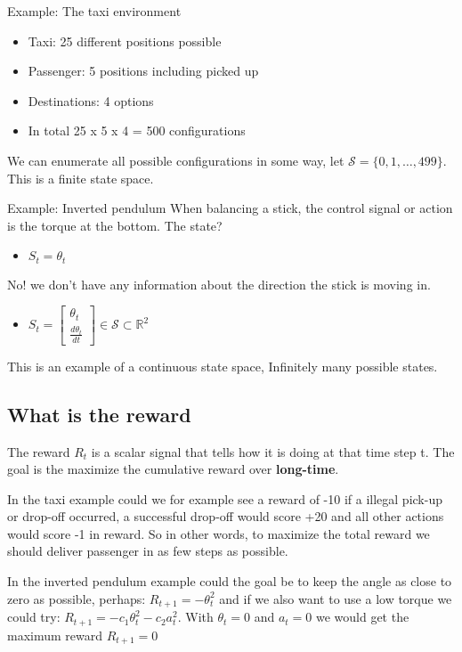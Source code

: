 \begin{example}{Example: The taxi environment}
\begin{itemize}
	\item Taxi: 25 different positions possible 
	\item Passenger: 5 positions including picked up
	\item Destinations: 4 options
	\item In total 25 x 5 x 4 = 500 configurations
\end{itemize}
We can enumerate all possible configurations in some way, let $\mathcal{S} = \{ 0,1, \ldots, 499\}$. This is a finite state space. 
\end{example}	

\begin{example}{Example: Inverted pendulum}
When balancing a stick, the control signal or action is the torque at the bottom. The state? 
\begin{itemize}
	\item $S_t = \theta_t$
\end{itemize}
No! we don't have any information about the direction the stick is moving in.

\begin{itemize}
 	\item $S_t = \begin{bmatrix} \theta_t \\ \frac{d \theta_t} {dt}  \end{bmatrix} \in \mathcal{S} \subset \mathbb{R}^{2} $
 \end{itemize} 
 This is an example of a continuous state space, Infinitely many possible states.

\end{example}	


\subsection*{What is the reward}
The reward $R_t$ is a scalar signal that tells how it is doing at that time step t. The goal is the maximize the cumulative reward over \textbf{long-time}. 

In the taxi example could we for example see a reward of -10 if a illegal pick-up or drop-off occurred, a successful drop-off would score +20 and all other actions would score -1 in reward. So in other words, to maximize the total reward we should deliver passenger in as few steps as possible. 

In the inverted pendulum example could the goal be to keep the angle as close to zero as possible, perhaps: $R_{t+1} = - \theta_t^{2}$ and if we also want to use a low torque we could try: $R_{t+1} = -c_1\theta_t^{2} - c_2a_t^{2}$. With $\theta_t = 0$ and $a_t = 0$ we would get the maximum reward $R_{t+1} = 0$


